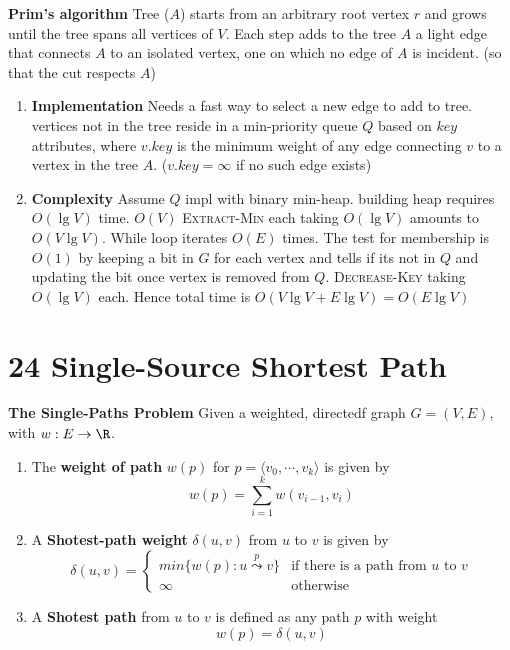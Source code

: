 \documentclass[11pt]{article}
\begin{document}
\begin{defn*}
    \textbf{Prim's algorithm} Tree ($A$) starts from an arbitrary root vertex $r$ and grows until the tree spans all vertices of $V$. Each step adds to the tree $A$ a light edge that connects $A$ to an isolated vertex, one on which no edge of $A$ is incident. (so that the cut respects $A$)
    \begin{enumerate}
        \item \textbf{Implementation} Needs a fast way to select a new edge to add to tree. vertices not in the tree reside in a min-priority queue $Q$ based on $key$ attributes, where $v.key$ is the minimum weight of any edge connecting $v$ to a vertex in the tree $A$. ($v.key = \infty$ if no such edge exists) 
        \item \textbf{Complexity} Assume $Q$ impl with binary min-heap. building heap requires $O(\lg V)$ time. $O(V)$ \textsc{Extract-Min} each taking $O(\lg V)$ amounts to $O(V\lg V)$. While loop iterates $O(E)$ times. The test for membership is $O(1)$ by keeping a bit in $G$ for each vertex and tells if its not in $Q$ and updating the bit once vertex is removed from $Q$. \textsc{Decrease-Key} taking $O(\lg V)$ each. Hence total time is $O(V\lg V + E\lg V) = O(E\lg V)$
    \end{enumerate}
\end{defn*}

\section*{24 Single-Source Shortest Path}


\begin{defn*}
    \textbf{The Single-Paths Problem} Given a weighted, directedf graph $G = (V,E)$, with $w: E\to\R$.

    \begin{enumerate}
        \item The \textbf{weight of path} $w(p)$ for $p = \langle v_0, \cdots, v_k \rangle$ is given by
        \[
            w(p) = \sum_{i=1}^k w(v_{i-1}, v_i)   
        \] 
        \item A \textbf{Shotest-path weight} $\delta(u,v)$ from $u$ to $v$ is given by 
        \[
            \delta(u,v) = 
            \begin{cases}
                min\{w(p): u\overset{p}{\leadsto} v \} & \text{if there is a path from $u$ to $v$}\\
                \infty & \text{otherwise}
            \end{cases}
        \]
        \item A \textbf{Shotest path} from $u$ to $v$ is defined as any path $p$ with weight 
        \[
            w(p) = \delta(u,v)
        \]
    \end{enumerate}

\end{defn*}
\end{document}
